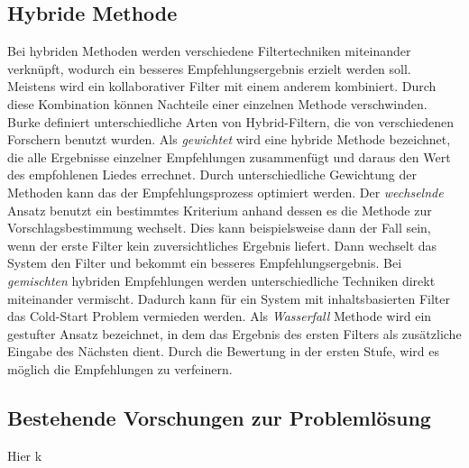 \documentclass[twosided,a4,10pt]{article}
\begin{document}
\begin{multicols}{2}
				
		\subsection{Hybride Methode}
		Bei hybriden Methoden werden verschiedene Filtertechniken miteinander verknüpft, wodurch ein besseres Empfehlungsergebnis erzielt werden soll. Meistens wird ein kollaborativer Filter mit einem anderem kombiniert. Durch diese Kombination können Nachteile einer einzelnen Methode verschwinden. \cite{burke}\newline
		Burke \cite{burke} definiert unterschiedliche Arten von Hybrid-Filtern, die von verschiedenen Forschern benutzt wurden.\newline
		Als \textit{gewichtet} wird eine hybride Methode bezeichnet, die alle Ergebnisse einzelner Empfehlungen zusammenfügt und daraus den Wert des empfohlenen Liedes errechnet. Durch unterschiedliche Gewichtung der Methoden kann das der Empfehlungsprozess optimiert werden. Der \textit{wechselnde} Ansatz benutzt ein bestimmtes Kriterium anhand dessen es die Methode zur Vorschlagsbestimmung wechselt. Dies kann beispielsweise dann der Fall sein, wenn der erste Filter kein zuversichtliches Ergebnis liefert. Dann wechselt das System den Filter und bekommt ein besseres Empfehlungsergebnis. Bei \textit{gemischten} hybriden Empfehlungen werden unterschiedliche Techniken direkt miteinander vermischt. Dadurch kann für ein System mit inhaltsbasierten Filter das Cold-Start Problem vermieden werden. Als \textit{Wasserfall} Methode wird ein gestufter Ansatz bezeichnet, in dem das Ergebnis des ersten Filters als zusätzliche Eingabe des Nächsten dient. Durch die Bewertung in der ersten Stufe, wird es möglich die Empfehlungen zu verfeinern.
		
		\subsection{Bestehende Vorschungen zur Problemlösung}
		Hier k
		
		

\end{multicols}
\end{document}
